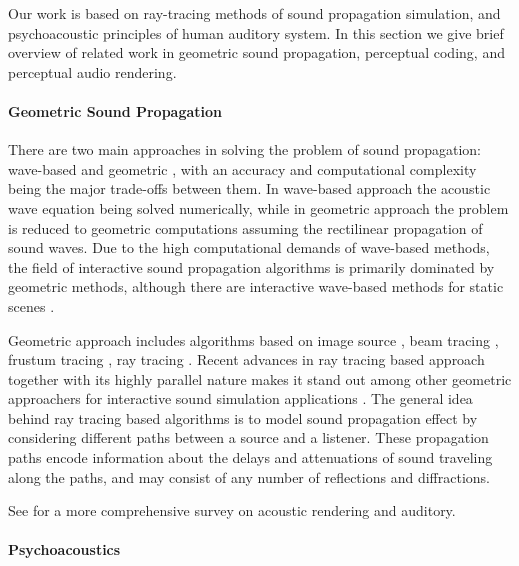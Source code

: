 Our work is based on ray-tracing methods of sound propagation simulation, and psychoacoustic principles of human auditory system. In this section we give brief overview of related work in geometric sound propagation, perceptual coding, and perceptual audio rendering.

\paragraph{Geometric Sound Propagation} 


There are two main approaches in solving the problem of sound propagation: wave-based \cite{savioja2010real,thompson2006review,gumerov2009wideband} and geometric \cite{funkhouser2003survey}, with an accuracy and computational complexity being the major trade-offs between them. In wave-based approach the acoustic wave equation being solved numerically, while in geometric approach the problem is reduced to geometric computations assuming the rectilinear propagation of sound waves. Due to the high computational demands of wave-based methods, the field of interactive sound propagation algorithms is primarily dominated by geometric methods, although there are interactive wave-based methods for static scenes \cite{raghuvanshi2010precomputed,mehra2013wave}.

Geometric approach includes algorithms based on image source \cite{borish1984extension}, beam tracing \cite{tsingos2001modeling}, frustum tracing \cite{chandak2009fastv}, ray tracing \cite{taylor2012guided,schissler2014high}. Recent advances in ray tracing based approach together with its highly parallel nature makes it stand out among other geometric approachers for interactive sound simulation applications \cite{taylor2010sound,schissler2011gsound}. The general idea behind ray tracing based algorithms is to model sound propagation effect by considering different paths between a source and a listener. These propagation paths encode information about the delays and attenuations of sound traveling along the paths, and may consist of any number of reflections and diffractions. 

See \cite{hulusic2012acoustic} for a more comprehensive survey on acoustic rendering and auditory.

\paragraph{Psychoacoustics}

